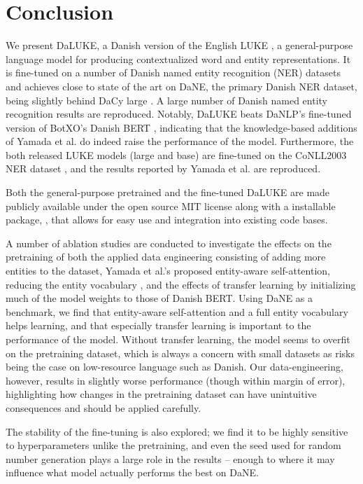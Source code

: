 \documentclass[main.tex]{subfiles}
\begin{document}
\chapter{Conclusion}
We present DaLUKE, a Danish version of the English LUKE \cite{yamada2020luke}, a general-purpose language model for producing contextualized word and entity representations.
It is fine-tuned on a number of Danish named entity recognition (NER) datasets and achieves close to state of the art on DaNE, the primary Danish NER dataset, being slightly behind DaCy large \cite{enevoldsen2020dacy}.
A large number of Danish named entity recognition results are reproduced.
Notably, DaLUKE beats DaNLP's fine-tuned version of BotXO's Danish BERT \cite{danlp2021, botxo2019dabert}, indicating that the knowledge-based additions of Yamada et al. \cite{yamada2020luke} do indeed raise the performance of the model.
Furthermore, the both released LUKE models (large and base) are fine-tuned on the CoNLL2003 NER dataset \cite{tjang2003conll}, and the results reported by Yamada et al. are reproduced.

Both the general-purpose pretrained and the fine-tuned DaLUKE are made publicly available under the open source MIT license \cite{mitlicense} along with a  installable package, , that allows for easy use and integration into existing code bases.

A number of ablation studies are conducted to investigate the effects on the pretraining of both the applied data engineering consisting of adding more entities to the dataset, Yamada et al.'s proposed entity-aware self-attention, reducing the entity vocabulary \cite{yamada2020luke}, and the effects of transfer learning by initializing much of the model weights to those of Danish BERT.
Using DaNE as a benchmark, we find that entity-aware self-attention and a full entity vocabulary helps learning, and that especially transfer learning is important to the performance of the model.
Without transfer learning, the model seems to overfit on the pretraining dataset, which is always a concern with small datasets as risks being the case on low-resource language such as Danish.
Our data-engineering, however, results in slightly worse performance (though within margin of error), highlighting how changes in the pretraining dataset can have unintuitive consequences and should be applied carefully.

The stability of the fine-tuning is also explored; we find it to be highly sensitive to hyperparameters unlike the pretraining, and even the seed used for random number generation plays a large role in the results -- enough to where it may influence what model actually performs the best on DaNE.
\end{document}
